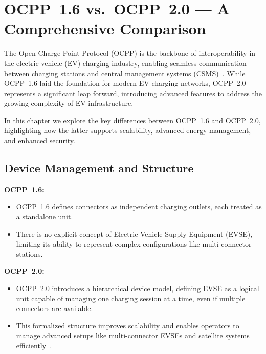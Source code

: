 \documentclass[12pt,a4paper]{report}
\begin{document}

\chapter{OCPP~1.6 vs.\ OCPP~2.0 --- A Comprehensive Comparison}

The Open Charge Point Protocol (OCPP) is the backbone of interoperability in the electric vehicle
(EV) charging industry, enabling seamless communication between charging stations and central
management systems (CSMS)~\autocite{ocpp16_ed2, ocpp201}. While OCPP~1.6 laid the foundation for
modern EV charging networks, OCPP~2.0 represents a significant leap forward, introducing advanced
features to address the growing complexity of EV infrastructure.

In this chapter we explore the key differences between OCPP~1.6 and OCPP~2.0, highlighting how
the latter supports scalability, advanced energy management, and enhanced security.

\section{Device Management and Structure}

\textbf{OCPP~1.6:}
\begin{itemize}
  \item OCPP~1.6 defines connectors as independent charging outlets, each treated as a standalone
        unit.
  \item There is no explicit concept of Electric Vehicle Supply Equipment (EVSE), limiting its
        ability to represent complex configurations like multi-connector stations.
\end{itemize}

\textbf{OCPP~2.0:}
\begin{itemize}
  \item OCPP~2.0 introduces a hierarchical device model, defining EVSE as a logical unit capable
        of managing one charging session at a time, even if multiple connectors are available.
  \item This formalized structure improves scalability and enables operators to manage advanced
        setups like multi-connector EVSEs and satellite systems efficiently~\autocite{ocpp201}.
\end{itemize}
\end{document}
